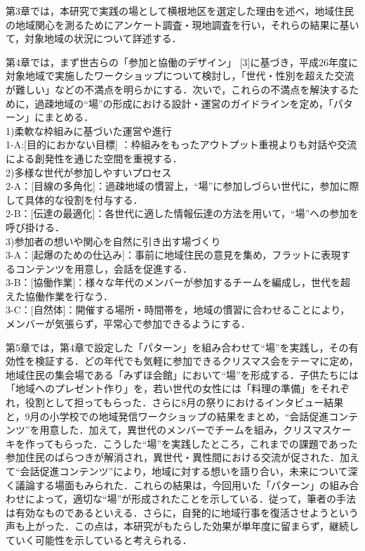 \documentclass[a4paper]{jsarticle}
\begin{document}
第3章では，本研究で実践の場として横根地区を選定した理由を述べ，地域住民の地域関心を測るためにアンケート調査・現地調査を行い，それらの結果に基いて，対象地域の状況について詳述する．\par
第4章では，まず世古らの「参加と協働のデザイン」 [3]に基づき，平成26年度に対象地域で実施したワークショップについて検討し，「世代・性別を超えた交流が難しい」などの不満点を明らかにする．次いで，これらの不満点を解決するために，過疎地域の“場”の形成における設計・運営のガイドラインを定め，「パターン」にまとめる．\\
1)柔軟な枠組みに基づいた運営や進行\\
1-A:[目的におかない目標] ：枠組みをもったアウトプット重視よりも対話や交流による創発性を通じた空間を重視する．\\
2)多様な世代が参加しやすいプロセス\\
2-A：[目線の多角化]：過疎地域の慣習上，“場”に参加しづらい世代に，参加に際して具体的な役割を付与する．\\
2-B：[伝達の最適化]：各世代に適した情報伝達の方法を用いて，“場”への参加を呼び掛ける．\\
3)参加者の想いや関心を自然に引き出す場づくり\\
3-A：[起爆のための仕込み]：事前に地域住民の意見を集め，フラットに表現するコンテンツを用意し，会話を促進する．\\
3-B：[協働作業]：様々な年代のメンバーが参加するチームを編成し，世代を超えた協働作業を行なう．\\
3-C：[自然体]：開催する場所・時間帯を，地域の慣習に合わせることにより，メンバーが気張らず，平常心で参加できるようにする．\par
 第5章では，第4章で設定した「パターン」を組み合わせて“場”を実践し，その有効性を検証する．どの年代でも気軽に参加できるクリスマス会をテーマに定め，地域住民の集会場である「みずほ会館」において“場”を形成する．子供たちには「地域へのプレゼント作り」を，若い世代の女性には「料理の準備」をそれぞれ，役割として担ってもらった．さらに8月の祭りにおけるインタビュー結果と，9月の小学校での地域発信ワークショップの結果をまとめ，“会話促進コンテンツ”を用意した．加えて，異世代のメンバーでチームを組み，クリスマスケーキを作ってもらった．こうした“場”を実践したところ，これまでの課題であった参加住民のばらつきが解消され，異世代・異性間における交流が促された．加えて“会話促進コンテンツ”により，地域に対する想いを語り合い，未来について深く議論する場面もみられた．これらの結果は，今回用いた「パターン」の組み合わせによって，適切な“場”が形成されたことを示している．従って，筆者の手法は有効なものであるといえる．さらに，自発的に地域行事を復活させようという声も上がった．この点は，本研究がもたらした効果が単年度に留まらず，継続していく可能性を示していると考えられる．\par
\end{document}
